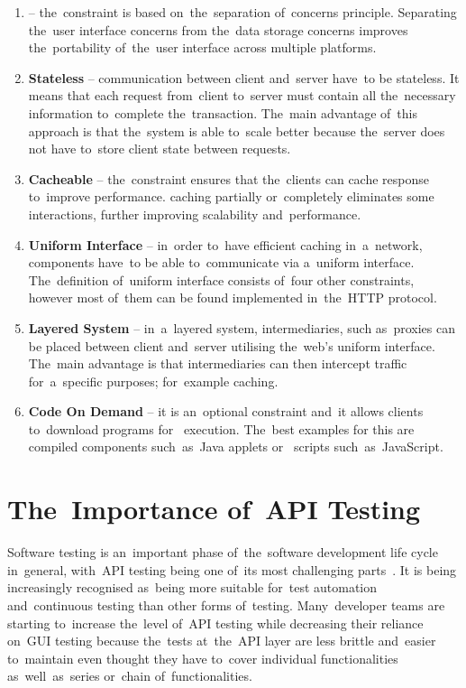 \begin{enumerate}
  \item \textbf{} -- the~constraint is based
  on~the~separation of~concerns principle. Separating the~user interface
  concerns from the~data storage concerns improves the~portability of~the~user
  interface across multiple platforms.
  \item \textbf{Stateless} -- communication between client and~server have~to be
  stateless. It means that each request from~client to~server must contain all
  the~necessary information to~complete the~transaction. The~main advantage
  of~this approach is that the~system is able to~scale better because the~server
  does not have to~store client state between requests.
  \item \textbf{Cacheable} -- the~constraint ensures that the~clients can cache
  response to~improve performance.  caching partially
  or~completely eliminates some  interactions, further
  improving scalability and~performance.
  \item \textbf{Uniform Interface} -- in~order to~have efficient caching
  in~a~network, components have~to be able to~communicate via a~uniform
  interface.
  The~definition of~uniform interface consists of~four other constraints,
  however most of~them can be found implemented in~the~HTTP protocol.
  \item \textbf{Layered System} -- in~a~layered system, intermediaries, such
  as~proxies can be placed between client and~server utilising the~web's uniform
  interface. The~main advantage is that intermediaries can then intercept
   traffic for~a~specific purposes; for~example caching.
  \item \textbf{Code On Demand} -- it is an~optional constraint and~it allows
  clients to~download programs for~ execution. The~best examples
  for this are compiled components such~as~Java applets or~
  scripts such~as~JavaScript.
\end{enumerate}



\section{The~Importance of~API Testing}
\label{frameworks}
Software testing is an~important phase of~the~software development life cycle
in~general, with~API testing being one of~its most challenging
parts~\cite{TestingAPI}. It is being increasingly recognised as~being more
suitable for~test automation and~continuous testing than other forms of~testing.
Many~developer teams are starting to~increase the~level of~API testing while
decreasing their reliance on~GUI testing because the~tests at~the~API layer are
less brittle and~easier to~maintain even thought they have to~cover
individual functionalities as~well~as~series or~chain of~functionalities.

